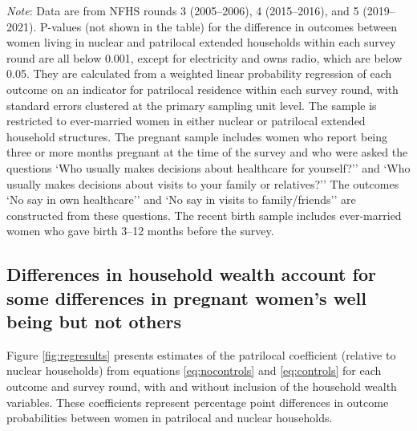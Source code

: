 \documentclass[12pt]{article}
\begin{document}
\begin{table}[H]
\caption{: Pregnant women in patrilocal extended households are advantaged in wealth and maternal healthcare use, but disadvantaged in autonomy outcomes}
\label{tab:sumstats}
\vspace{-4pt}

\begin{scriptsize}
\setlength{\tabcolsep}{7pt}
\renewcommand{\arraystretch}{1.15}

\makebox[\linewidth][c]{%
%
}

\end{scriptsize}

\vspace{1ex}
\small\scriptsize{\textsf{\textit{Note}: Data are from NFHS rounds 3 (2005--2006), 4 (2015--2016), and 5 (2019--2021).}}
\small\scriptsize{\textsf{P-values (not shown in the table) for the difference in outcomes between women living in nuclear and patrilocal extended households within each survey round are all below 0.001, except for electricity and owns radio, which are below 0.05. They are calculated from a weighted linear probability regression of each outcome on an indicator for patrilocal residence within each survey round, with standard errors clustered at the primary sampling unit level.}}
\newline
\small\scriptsize{\textsf{The sample is restricted to ever-married women in either nuclear or patrilocal extended household structures. The pregnant sample includes women who report being three or more months pregnant at the time of the survey and who were asked the questions `Who usually makes decisions about healthcare for yourself?'' and `Who usually makes decisions about visits to your family or relatives?''}}
\small\scriptsize{\textsf{The outcomes `No say in own healthcare'' and `No say in visits to family/friends'' are constructed from these questions. The recent birth sample includes ever-married women who gave birth 3--12 months before the survey.}}

\end{table}

\subsection*{Differences in household wealth account for some differences in pregnant women's well being but not others}

Figure \ref{fig:regresults} presents estimates of the patrilocal coefficient (relative to nuclear households) from equations \ref{eq:nocontrols} and \ref{eq:controls} for each outcome and survey round, with and without inclusion of the household wealth variables. These coefficients represent percentage point differences in outcome probabilities between women in patrilocal and nuclear households.
\end{document}
